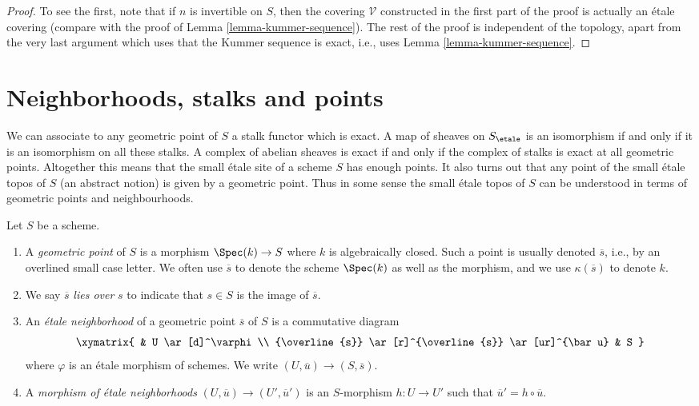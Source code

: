 \begin{proof}
\medskip\noindent
To see the first, note that if $n$ is invertible on $S$, then the
covering $\mathcal{V}$ constructed in the first part of the proof
is actually an \'etale covering (compare with the proof of
Lemma \ref{lemma-kummer-sequence}). The rest of the proof is independent
of the topology, apart from the very last argument which uses that
the Kummer sequence is exact, i.e., uses Lemma \ref{lemma-kummer-sequence}.
\end{proof}






\section{Neighborhoods, stalks and points}
\label{section-stalks}

\noindent
We can associate to any geometric point of $S$ a stalk functor which is
exact. A map of sheaves on $S_\etale$ is an isomorphism if and only
if it
is an isomorphism on all these stalks. A complex of abelian sheaves is
exact if and only if the complex of stalks is exact at all geometric points.
Altogether this means that the small \'etale site of a scheme $S$
has enough points. It also turns out that any point of the small \'etale topos
of $S$ (an abstract notion) is given by a geometric point.
Thus in some sense the small \'etale topos of $S$ can be understood in
terms of geometric points and neighbourhoods.

\begin{definition}
\label{definition-geometric-point}
Let $S$ be a scheme.
\begin{enumerate}
\item A {\it geometric point} of $S$ is a morphism
$\Spec(k) \to S$ where $k$ is algebraically closed.
Such a point is usually denoted $\overline{s}$, i.e., by an overlined
small case letter. We often use $\overline{s}$ to denote the scheme
$\Spec(k)$ as well as the morphism, and we use $\kappa(\overline{s})$
to denote $k$.
\item We say $\overline{s}$ {\it lies over} $s$
to indicate that $s \in S$ is the image of $\overline{s}$.
\item An {\it \'etale neighborhood} of a geometric point $\overline{s}$
of $S$ is a commutative diagram
$$
\xymatrix{
& U \ar[d]^\varphi \\
{\overline{s}} \ar[r]^{\overline{s}} \ar[ur]^{\bar u} & S
}
$$
where $\varphi$ is an \'etale morphism of schemes.
We write $(U, \overline{u}) \to (S, \overline{s})$.
\item A {\it morphism of \'etale neighborhoods}
$(U, \overline{u}) \to (U', \overline{u}')$
is an $S$-morphism $h: U \to U'$
such that $\overline{u}' = h \circ \overline{u}$.
\end{enumerate}
\end{definition}

